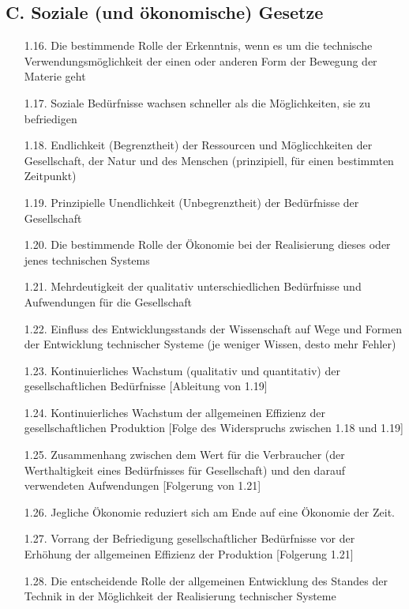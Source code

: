 \documentclass[11pt,a4paper]{article}
\begin{document}
\subsection*{C. Soziale (und ökonomische) Gesetze}
\begin{itemize}\itemsep0pt
\item[1.16.] Die bestimmende Rolle der Erkenntnis, wenn es um die technische
  Verwendungsmöglich\-keit der einen oder anderen Form der Bewegung der
  Materie geht
\item[1.17.] Soziale Bedürfnisse wachsen schneller als die Möglichkeiten, sie
  zu befriedigen
\item[1.18.] Endlichkeit (Begrenztheit) der Ressourcen und Möglicchkeiten der
  Gesellschaft, der Natur und des Menschen (prinzipiell, für einen bestimmten
  Zeitpunkt)
\item[1.19.] Prinzipielle Unendlichkeit (Unbegrenztheit) der Bedürfnisse der
  Gesellschaft
\item[1.20.] Die bestimmende Rolle der Ökonomie bei der Realisierung dieses
  oder jenes technischen Systems
\item[1.21.] Mehrdeutigkeit der qualitativ unterschiedlichen Bedürfnisse und
  Aufwendungen für die Gesellschaft
\item[1.22.] Einfluss des Entwicklungsstands der Wissenschaft auf Wege und
  Formen der Entwicklung technischer Systeme (je weniger Wissen, desto mehr
  Fehler)
\item[1.23.] Kontinuierliches Wachstum (qualitativ und quantitativ) der
  gesellschaftlichen Bedürf\-nisse [Ableitung von 1.19]
\item[1.24.] Kontinuierliches Wachstum der allgemeinen Effizienz der
  gesellschaftlichen Produktion [Folge des Widerspruchs zwischen 1.18 und
    1.19]
\item[1.25.] Zusammenhang zwischen dem Wert für die Verbraucher (der
  Werthaltigkeit eines Be\-dürfnisses für Gesellschaft) und den darauf
  verwendeten Aufwendungen [Folgerung von 1.21]
\item[1.26.] Jegliche Ökonomie reduziert sich am Ende auf eine Ökonomie der
  Zeit.
\item[1.27.] Vorrang der Befriedigung gesellschaftlicher Bedürfnisse vor der
  Erhöhung der allgemeinen Effizienz der Produktion [Folgerung 1.21]
\item[1.28.] Die entscheidende Rolle der allgemeinen Entwicklung des Standes
  der Technik in der Möglichkeit der Realisierung technischer Systeme
\end{itemize}
\end{document}
